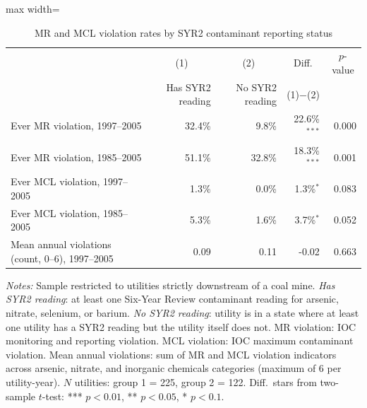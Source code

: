 \begin{table}[htbp]
\centering
\caption{MR and MCL violation rates by SYR2 contaminant reporting status}
\label{tab:syr2_mr_comparison}
\begin{adjustbox}{max width=\textwidth}
\begin{tabular}{lrrrr}
\hline\hline
 & \multicolumn{1}{c}{(1)} & \multicolumn{1}{c}{(2)} & \multicolumn{1}{c}{Diff.} & \multicolumn{1}{c}{$p$-value} \\
 & Has SYR2 reading & No SYR2 reading & (1)$-$(2) & \\
\hline
Ever MR violation, 1997--2005 & 32.4\% & 9.8\% & 22.6\%$^{***}$ & 0.000 \\
Ever MR violation, 1985--2005 & 51.1\% & 32.8\% & 18.3\%$^{***}$ & 0.001 \\
Ever MCL violation, 1997--2005 & 1.3\% & 0.0\% & 1.3\%$^{*}$ & 0.083 \\
Ever MCL violation, 1985--2005 & 5.3\% & 1.6\% & 3.7\%$^{*}$ & 0.052 \\
\hline
Mean annual violations (count, 0--6), 1997--2005 & 0.09 & 0.11 & -0.02 & 0.663 \\
\hline\hline
\end{tabular}
\end{adjustbox}
\begin{minipage}{\linewidth}
\vspace{4pt}
\footnotesize
\raggedright
\textit{Notes:} Sample restricted to utilities strictly downstream of a coal mine. \textit{Has SYR2 reading}: at least one Six-Year Review contaminant reading for arsenic, nitrate, selenium, or barium. \textit{No SYR2 reading}: utility is in a state where at least one utility has a SYR2 reading but the utility itself does not. MR violation: IOC monitoring and reporting violation. MCL violation: IOC maximum contaminant violation. Mean annual violations: sum of MR and MCL violation indicators across arsenic, nitrate, and inorganic chemicals categories (maximum of 6 per utility-year). $N$ utilities: group 1 = 225, group 2 = 122. Diff.~stars from two-sample $t$-test: *** $p<0.01$, ** $p<0.05$, * $p<0.1$.
\end{minipage}
\end{table}

